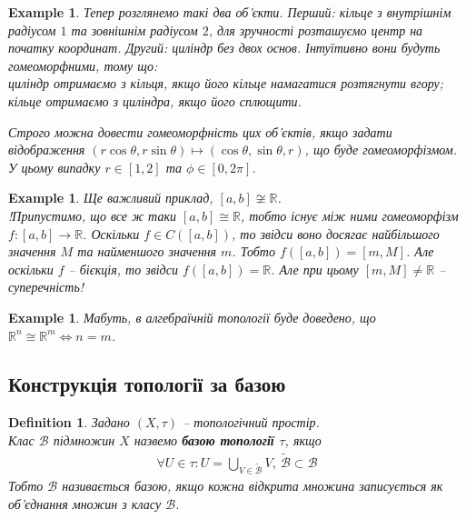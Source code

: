 \documentclass[a4paper, 10pt]{article}
\theoremstyle{theoremdd}
\newtheorem{definition}[theorem]{Definition}
\newtheorem{example}[theorem]{Example}
\begin{document}
\begin{example}
Тепер розглянемо такі два об'єкти. Перший: кільце з внутрішнім радіусом $1$ та зовнішнім радіусом $2$, для зручності розташуємо центр на початку координат. Другий: циліндр без двох основ. Інтуїтивно вони будуть гомеоморфними, тому що:\\
циліндр отримаємо з кільця, якщо його кільце намагатися розтягнути вгору;\\
кільце отримаємо з циліндра, якщо його сплющити.
\begin{figure}[H]
\centering
{}
\qquad
{}
\end{figure}
\noindent
Строго можна довести гомеоморфність цих об'єктів, якщо задати відображення $(r \cos \theta, r \sin \theta) \mapsto (\cos \theta, \sin \theta,r)$, що буде гомеоморфізмом. У цьому випадку $r \in [1,2]$ та $\phi \in [0,2\pi]$.
\end{example}

\begin{example}
Ще важливий приклад, $[a,b] \not\cong \mathbb{R}$.\\
!Припустимо, що все ж таки $[a,b] \cong \mathbb{R}$, тобто існує між ними гомеоморфізм $f \colon [a,b] \to \mathbb{R}$. Оскільки $f \in C([a,b])$, то звідси воно досягає найбільшого значення $M$ та найменшого значення $m$. Тобто $f([a,b]) = [m,M]$. Але оскільки $f$ -- бієкція, то звідси $f([a,b]) = \mathbb{R}$. Але при цьому $[m,M] \neq \mathbb{R}$ -- суперечність!
\end{example}

\begin{example}
Мабуть, в алгебраїчній топології буде доведено, що $\mathbb{R}^n \cong \mathbb{R}^m \iff n = m$.
\end{example}

\subsection{Конструкція топології за базою}
\begin{definition}
Задано $(X,\tau)$ -- топологічний простір.\\
Клас $\mathcal{B}$ підмножин $X$ назвемо \textbf{базою топології $\tau$}, якщо
\begin{align*}
\forall U \in \tau: U = \bigcup_{V \in \mathcal{\tilde{B}}} V,\ \mathcal{\tilde{B}} \subset \mathcal{B}
\end{align*}
Тобто $\mathcal{B}$ називається базою, якщо кожна відкрита множина записується як об'єднання множин з класу $\mathcal{B}$.
\end{definition}
\end{document}
